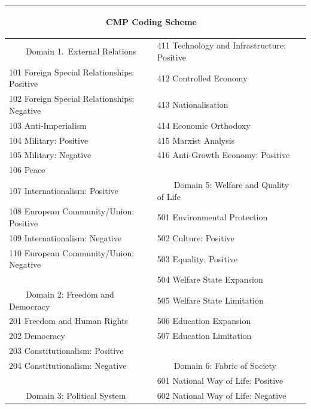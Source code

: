 \documentclass[11pt,a4paper]{article}
\newcommand{\tabitem}{~~\llap{\textbullet}~~}
\begin{document}
\begin{small}
\begin{table}
  \begin{tabular}{lll}
    \toprule
    \multicolumn{2}{c}{\begin{centering} \textbf{CMP Coding Scheme}\end{centering}} \\[.5\normalbaselineskip]
    \midrule
   \tabitem Domain 1.~External Relations  & 411 Technology and Infrastructure: Positive\\
   	101 Foreign Special Relationships: Positive & \color{red} 412 Controlled Economy\\
    102 Foreign Special Relationships: Negative & \color{red} 413 Nationalisation\\
  \color{red}  103 Anti-Imperialism & \color{blue} 414 Economic Orthodoxy\\
  \color{blue}  104 Military: Positive & 415 Marxist Analysis \\
 \color{red}   105 Military: Negative & 416 Anti-Growth Economy: Positive \\
   \color{red} 106 Peace & \\
   \color{red} 107 Internationalism: Positive & \tabitem Domain 5: Welfare and Quality of Life \\
    108 European Community/Union: Positive & 501 Environmental Protection\\
    109 Internationalism: Negative &   502 Culture: Positive\\
    110 European Community/Union: Negative & 503 Equality: Positive\\
     &  \color{red} 504 Welfare State Expansion\\
   \tabitem Domain 2: Freedom and Democracy &  \color{blue}   505 Welfare State Limitation\\
  \color{blue} 201 Freedom and Human Rights & \color{red} 506 Education Expansion\\
 \color{red} 202 Democracy & 507 Education Limitation\\
  \color{blue} 203 Constitutionalism: Positive \\
  204 Constitutionalism: Negative & \tabitem Domain 6: Fabric of Society\\
    & \color{blue} 601 National Way of Life: Positive\\
\tabitem Domain 3: Political System &    602 National Way of Life: Negative

\end{tabular}
\end{table}
\end{small}
\end{document}
